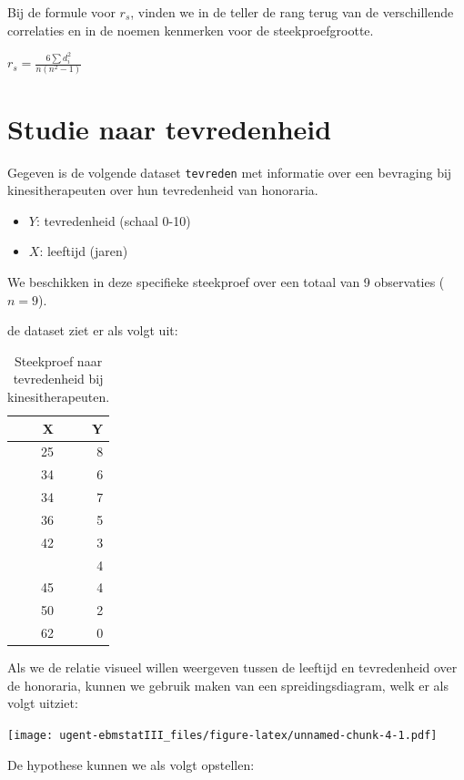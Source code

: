\documentclass[
]{book}
\providecommand{\tightlist}{%
  \setlength{\itemsep}{0pt}\setlength{\parskip}{0pt}}
\theoremstyle{definition}
\theoremstyle{definition}
\theoremstyle{definition}
\theoremstyle{definition}
\theoremstyle{remark}
\begin{document}
Bij de formule voor \(r_s\), vinden we in de teller de rang terug van de verschillende correlaties en in de noemen kenmerken voor de steekproefgrootte.

\(r_s = \frac{6 \sum d^2_i}{n(n^2-1)}\)

\hypertarget{studie-naar-tevredenheid}{%
\section*{Studie naar tevredenheid}\label{studie-naar-tevredenheid}}


Gegeven is de volgende dataset \texttt{tevreden} met informatie over een bevraging bij kinesitherapeuten over hun tevredenheid van honoraria.

\begin{itemize}
\tightlist
\item
  \(Y\): tevredenheid (schaal 0-10)
\item
  \(X\): leeftijd (jaren)
\end{itemize}

We beschikken in deze specifieke steekproef over een totaal van 9 observaties (\(n = 9\)).

de dataset ziet er als volgt uit:

\begin{table}

\caption{\label{tab:tevereden}Steekproef naar tevredenheid bij kinesitherapeuten.}
\centering
\begin{tabular}[t]{rr}
\toprule
X & Y\\
\midrule
25 & 8\\
34 & 6\\
34 & 7\\
36 & 5\\
42 & 3\\
\addlinespace
44 & 4\\
45 & 4\\
50 & 2\\
62 & 0\\
\bottomrule
\end{tabular}
\end{table}

Als we de relatie visueel willen weergeven tussen de leeftijd en tevredenheid over de honoraria, kunnen we gebruik maken van een spreidingsdiagram, welk er als volgt uitziet:

\texttt{[image: ugent-ebmstatIII\_files/figure-latex/unnamed-chunk-4-1.pdf]}

De hypothese kunnen we als volgt opstellen:
\end{document}
